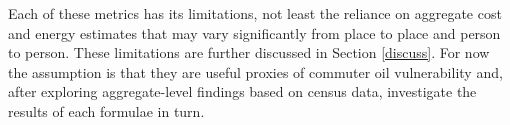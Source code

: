 Each of these metrics has its limitations, not least the reliance on aggregate
cost and energy estimates that may vary significantly from place to place and
person to person. These limitations are further discussed in Section
\ref{discuss}.
For now the assumption is that they are useful proxies of commuter
oil vulnerability and, after exploring aggregate-level
findings based on census data, investigate the results of each formulae in turn.

% 

